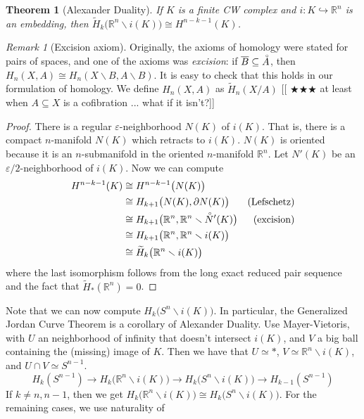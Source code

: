 \documentclass[12pt]{article}
\makeatletter
\theoremstyle{plain}
\newtheorem{theorem}[equation]{Theorem}
\theoremstyle{definition}
\theoremstyle{remark}
\newtheorem{remark}[equation]{Remark}
\newcommand{\anton}[1]{[[\index{"!@notes and corrections}
                        \ensuremath{\bigstar\bigstar\bigstar} #1]]}
\newcommand{\bbar}[1]{\overline{#1}}
\renewcommand{\H}{\widetilde H}
\newcommand{\inn}[1]{\accentset{\circ}{#1}}
\newcommand{\RR}{\ensuremath{\mathbb{R}}}
\makeatother
\begin{document}
 \begin{theorem}[Alexander Duality]
   If $K$ is a finite CW complex and $i:K\hookrightarrow \RR^n$ is an embedding, then
   $\H_k\bigl(\RR^n\smallsetminus i(K)\bigr)\cong H^{n-k-1}(K)$.
 \end{theorem}
 \begin{remark}[Excision axiom]
   Originally, the axioms of homology were stated for pairs of spaces, and one of the
   axioms was \emph{excision}: if $\bbar B\subseteq\inn A$, then $H_n(X,A)\cong
   H_n(X\smallsetminus B,A\smallsetminus B)$. It is easy to check that this holds in our
   formulation of homology. We define $H_n(X,A)$ as $\H_n(X/A)$ \anton{at least when
   $A\subseteq X$ is a cofibration ... what if it isn't?}
 \end{remark}
 \begin{proof}
   There is a regular $\varepsilon$-neighborhood $N(K)$ of $i(K)$. That is, there is a
   compact $n$-manifold $N(K)$ which retracts to $i(K)$. $N(K)$ is oriented because it is
   an $n$-submanifold in the oriented $n$-manifold $\RR^n$. Let $N'(K)$ be an
   $\varepsilon/2$-neighborhood of $i(K)$. Now we can compute
   \begin{align*}
     H^{n-k-1}(K) &\cong H^{n-k-1}\bigl(N(K)\bigr)\\
        &\cong H_{k+1}\bigl(N(K),\partial N(K)\bigr) & \text{(Lefschetz)}\\
        &\cong H_{k+1}\bigl(\RR^n,\RR^n\smallsetminus \inn N'(K)\bigr) &\text{(excision)}\\
        &\cong H_{k+1}\bigl(\RR^n,\RR^n\smallsetminus i(K)\bigr)\\
        &\cong \H_k\bigl(\RR^n\smallsetminus i(K)\bigr)
   \end{align*}
   where the last isomorphism follows from the long exact reduced pair sequence and the
   fact that $\H_*(\RR^n)=0$.
 \end{proof}
 Note that we can now compute $H_k\bigl(S^n\smallsetminus i(K)\bigr)$. In particular,
 the Generalized Jordan Curve Theorem is a corollary of Alexander Duality. Use
 Mayer-Vietoris, with $U$ an neighborhood of infinity that doesn't intersect $i(K)$, and
 $V$ a big ball containing the (missing) image of $K$. Then we have that $U\simeq \ast$,
 $V\simeq \RR^n\smallsetminus i(K)$, and $U\cap V\simeq S^{n-1}$.
 \[
    H_k(S^{n-1})\to H_k\bigl(\RR^n\smallsetminus i(K)\bigr) \to
    H_k\bigl(S^n\smallsetminus i(K)\bigr) \to H_{k-1}(S^{n-1})
 \]
 If $k\neq n,n-1$, then we get $H_k\bigl(\RR^n\smallsetminus i(K)\bigr) \cong
 H_k\bigl(S^n\smallsetminus i(K)\bigr)$. For the remaining cases, we use naturality of
\end{document}
